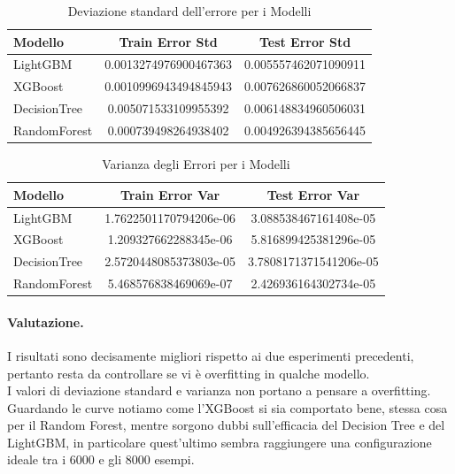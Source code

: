 \begin{table}[H]
    \centering
    \begin{tabular}{lcc}
    \toprule
    \textbf{Modello} & \textbf{Train Error Std} & \textbf{Test Error Std} \\
    \midrule
    LightGBM & 0.0013274976900467363 & 0.005557462071090911 \\
    XGBoost & 0.0010996943494845943 & 0.007626860052066837 \\
    DecisionTree & 0.005071533109955392 & 0.006148834960506031 \\
    RandomForest & 0.000739498264938402 & 0.004926394385656445 \\
    \bottomrule
    \end{tabular}
    \caption{Deviazione standard dell'errore per i Modelli}
\end{table}

\begin{table}[H]
    \centering
    \begin{tabular}{lcc}
    \toprule
    \textbf{Modello} & \textbf{Train Error Var} & \textbf{Test Error Var} \\
    \midrule
    LightGBM & 1.7622501170794206e-06 & 3.088538467161408e-05 \\
    XGBoost & 1.209327662288345e-06 & 5.816899425381296e-05 \\
    DecisionTree & 2.5720448085373803e-05 & 3.7808171371541206e-05 \\
    RandomForest & 5.468576838469069e-07 & 2.426936164302734e-05 \\
    \bottomrule
    \end{tabular}
    \caption{Varianza degli Errori per i Modelli}
\end{table}

\paragraph{Valutazione.} I risultati sono decisamente migliori rispetto ai due esperimenti precedenti, pertanto resta da controllare se vi è overfitting in qualche modello. \\ I valori di deviazione standard e varianza non portano a pensare a overfitting. Guardando le curve notiamo come l'XGBoost si sia comportato bene, stessa cosa per il Random Forest, mentre sorgono dubbi sull'efficacia del Decision Tree e del LightGBM, in particolare quest'ultimo sembra raggiungere una configurazione ideale tra i 6000 e gli 8000 esempi.

